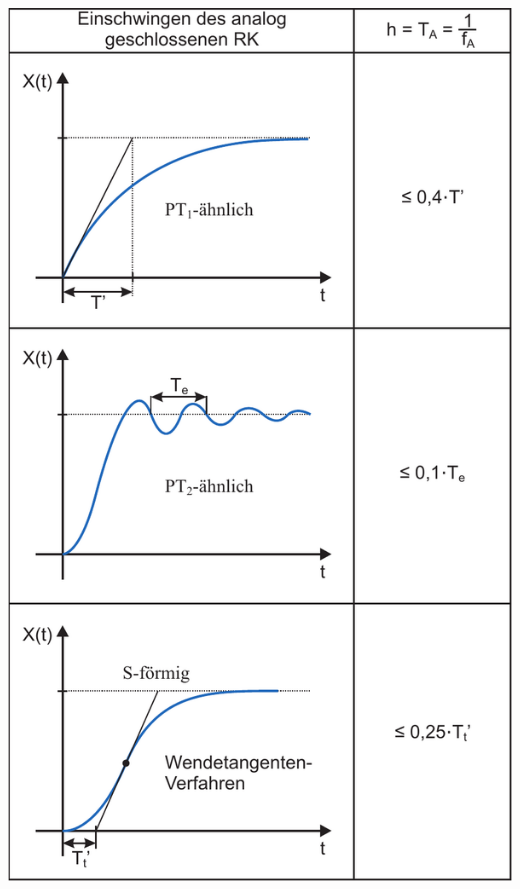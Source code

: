 \documentclass[a4paper,twocolumn,10pt]{article}
\begin{document}
\begin{center}
\includegraphics[width=0.85\columnwidth]{Grafiken/Faustformeln_Einschwingverhalten}
\end{center}
\end{document}
